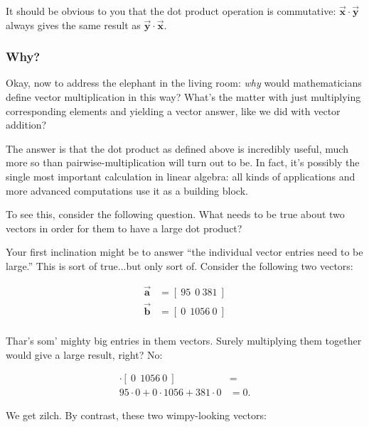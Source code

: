 
It should be obvious to you that the dot product operation is commutative:
$\overrightarrow{\textbf{x}} \cdot \overrightarrow{\textbf{y}}$ always gives
the same result as $\overrightarrow{\textbf{y}} \cdot
\overrightarrow{\textbf{x}}$.

\subsubsection{Why?}

Okay, now to address the elephant in the living room: \textit{why} would
mathematicians define vector multiplication in this way? What's the matter with
just multiplying corresponding elements and yielding a vector answer, like we
did with vector addition?

The answer is that the dot product as defined above is incredibly useful, much
more so than pairwise-multiplication will turn out to be. In fact, it's
possibly the single most important calculation in linear algebra: all kinds of
applications and more advanced computations use it as a building block.

To see this, consider the following question. What needs to be true about two
vectors in order for them to have a large dot product?

Your first inclination might be to answer ``the individual vector entries need
to be large.'' This is sort of true...but only sort of. Consider the following
two vectors:

\vspace{-.15in}
\begin{align*}
\overrightarrow{\textbf{a}} &= [\ 95\ \ 0\ 381\  ] \\
\overrightarrow{\textbf{b}} &= [\ 0\ \ 1056\ 0\  ] \\
\end{align*}
\vspace{-.15in}

Thar's som' mighty big entries in them vectors. Surely multiplying them
together would give a large result, right? No:

\vspace{-.15in}
\begin{align*}
[\ 95\ \ 0\ 381\ ] \cdot [\ 0\ \ 1056\ 0\ ] &= \\
95 \cdot 0 + 0 \cdot 1056 + 381 \cdot 0 &= 0.
\end{align*}
\vspace{-.15in}

We get zilch. By contrast, these two wimpy-looking vectors:

